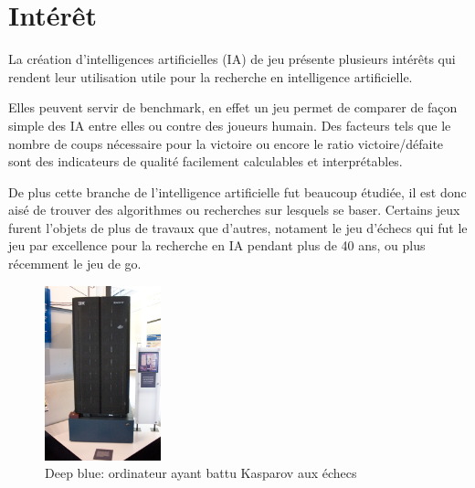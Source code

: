 \section{Intérêt}

	La création d'intelligences artificielles (IA) de jeu présente plusieurs intérêts
	qui rendent leur utilisation utile pour la recherche en intelligence artificielle.

	\vspace{1em}
	Elles peuvent servir de benchmark, en effet un jeu permet de comparer
	de façon simple des IA entre elles ou contre des joueurs humain.
	Des facteurs tels que le nombre de coups nécessaire pour la victoire ou encore
	le ratio victoire/défaite sont des indicateurs de qualité facilement calculables
	et interprétables.

	\vspace{1em}
	De plus cette branche de l'intelligence artificielle fut beaucoup étudiée,
	il est donc aisé de trouver des algorithmes ou recherches sur lesquels se baser.
	Certains jeux furent l'objets de plus de travaux que d'autres, notament le jeu
	d'échecs qui fut le jeu par excellence pour la recherche en IA pendant plus de 40 ans,
	ou plus récemment le jeu de go.

	\begin{figure}[h]
		\centering
		\includegraphics[width=0.3\textwidth]{images/Deep_Blue.jpg}
		\caption{Deep blue: ordinateur ayant battu Kasparov aux échecs}
		\label{fig:deep_blue}
	\end{figure}
